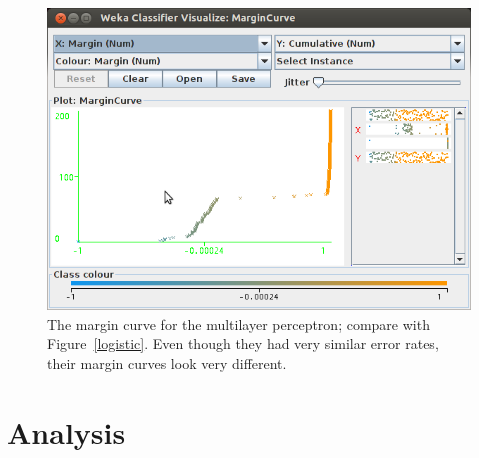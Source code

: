 \documentclass{amsart}
\begin{document}
	\begin{figure}
	\centering
	\label{multilayer}
	\includegraphics[width=6in]{multilayer_perceptron}
	\caption{The margin curve for the multilayer perceptron; compare with Figure~\ref{logistic}. Even though they had very similar error rates, their margin curves look very different.}
	\end{figure}
	

\section{Analysis}
\end{document}
